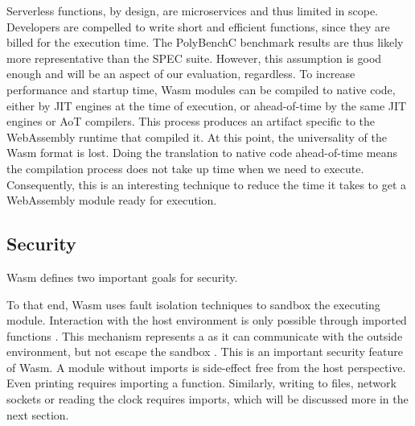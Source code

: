 Serverless functions, by design, are microservices and thus limited in scope. Developers are compelled to write short and efficient functions, since they are billed for the execution time. The PolyBenchC benchmark results are thus likely more representative than the SPEC suite. However, this assumption is good enough and will be an aspect of our evaluation, regardless.
To increase performance and startup time, Wasm modules can be compiled to native code, either by JIT engines at the time of execution, or ahead-of-time by the same JIT engines or AoT compilers. This process produces an artifact specific to the WebAssembly runtime that compiled it. At this point, the universality of the Wasm format is lost. Doing the translation to native code ahead-of-time means the compilation process does not take up time when we need to execute. Consequently, this is an interesting technique to reduce the time it takes to get a WebAssembly module ready for execution.




\subsection{Security}

Wasm defines two important goals for security.

\begin{quote}
\end{quote}

To that end, Wasm uses fault isolation techniques to sandbox the executing module. Interaction with the host environment is only possible through imported functions \cite{W3C2020}. This mechanism represents a  as it can communicate with the outside environment, but not escape the sandbox \cite{Haas2017}. This is an important security feature of Wasm. A module without imports is side-effect free from the host perspective. Even printing  requires importing a  function. Similarly, writing to files, network sockets or reading the clock requires imports, which will be discussed more in the next section.

